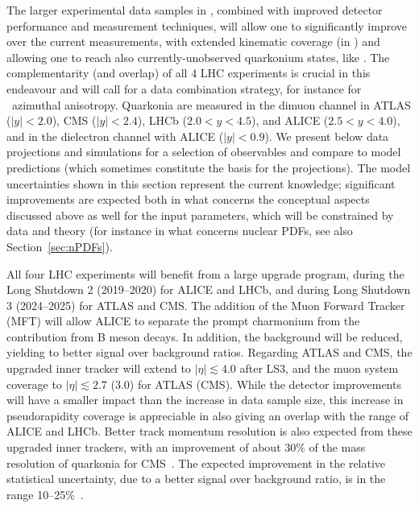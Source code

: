 \documentclass[../report.tex]{subfiles}
\begin{document}
The larger experimental data samples in \RunsThreeFour, combined with improved detector performance and measurement techniques, will allow one to significantly improve over the current measurements, with extended kinematic coverage (in \pT) and allowing one to reach also currently-unobserved quarkonium states, like 
.
The complementarity (and overlap) of all 4 LHC experiments is crucial in this endeavour and will call for a data combination strategy, for instance for \PGU\ azimuthal anisotropy.
Quarkonia are measured in the dimuon channel in ATLAS ($|y|<2.0$), CMS ($|y|<2.4$), LHCb ($2.0<y<4.5$), and ALICE ($2.5<y<4.0$), and in the dielectron channel with ALICE ($|y|<0.9$).
We present below data projections and simulations for a selection of observables and compare to model predictions (which sometimes constitute the basis for the projections). The model uncertainties shown in this section represent the current knowledge; significant improvements are expected both in what concerns the conceptual aspects discussed above as well for the input parameters, which will be constrained by data and theory (for instance in what concerns nuclear PDFs, see also Section~\ref{sec:nPDFs}).

All four LHC experiments will benefit from a large upgrade program, during the Long Shutdown 2 (2019--2020) for ALICE and LHCb, and during Long Shutdown 3 (2024--2025) for ATLAS and CMS.
The addition of the Muon Forward Tracker (MFT) will allow ALICE to separate the prompt charmonium from the contribution from B meson decays. In addition, the background will be reduced, yielding to better signal over background ratios. 
Regarding ATLAS and CMS, the upgraded inner tracker will extend to $|\eta|\lesssim 4.0$ after LS3, and the muon system coverage to $|\eta|\lesssim 2.7$ (3.0) for ATLAS (CMS). While the detector improvements will have a smaller impact than the
increase in data sample size, this increase in pseudorapidity coverage is appreciable in also giving an overlap with the range of ALICE and LHCb.
Better track momentum resolution is also expected from these upgraded inner trackers, with an improvement of about 30\% of the mass resolution of quarkonia for CMS~\cite{CMSCollaboration:2015zni}. The expected improvement in the 
relative statistical uncertainty, due to a better signal over background ratio, is in the range 10--25\%~\cite{CMS-PAS-FTR-18-024}.
\end{document}

